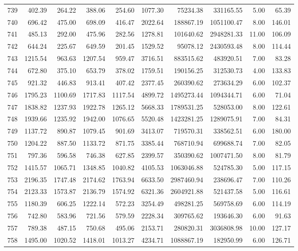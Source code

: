 \begin{tabular}{lrrrrrrrrr}
739 & 402.39 & 264.22 & 388.06 & 254.60 & 1077.30 & 75234.38 & 331165.55 & 5.00 & 65.39 \\
740 & 696.42 & 475.00 & 698.09 & 416.47 & 2022.64 & 188867.19 & 1051100.47 & 8.00 & 146.01 \\
741 & 485.13 & 292.00 & 475.96 & 282.56 & 1278.81 & 101640.62 & 2948281.33 & 11.00 & 106.09 \\
742 & 644.24 & 225.67 & 649.59 & 201.45 & 1529.52 & 95078.12 & 2430593.48 & 8.00 & 114.44 \\
743 & 1215.54 & 963.63 & 1207.54 & 959.47 & 3716.51 & 883515.62 & 483920.51 & 7.00 & 83.28 \\
744 & 672.80 & 375.10 & 653.79 & 378.02 & 1759.51 & 190156.25 & 312530.73 & 4.00 & 133.83 \\
745 & 921.32 & 446.83 & 913.41 & 407.42 & 2377.45 & 260390.62 & 273634.29 & 6.00 & 102.37 \\
746 & 1795.23 & 1100.69 & 1717.83 & 1117.54 & 4899.72 & 1495273.44 & 1094344.71 & 6.00 & 71.04 \\
747 & 1838.82 & 1237.93 & 1922.78 & 1265.12 & 5668.33 & 1789531.25 & 528053.00 & 8.00 & 122.61 \\
748 & 1939.66 & 1235.92 & 1942.00 & 1076.65 & 5520.48 & 1423281.25 & 1289075.91 & 7.00 & 84.31 \\
749 & 1137.72 & 890.87 & 1079.45 & 901.69 & 3413.07 & 719570.31 & 338562.51 & 6.00 & 180.00 \\
750 & 1204.22 & 887.50 & 1133.72 & 871.75 & 3385.44 & 768710.94 & 699688.74 & 7.00 & 82.05 \\
751 & 797.36 & 596.58 & 746.38 & 627.85 & 2399.57 & 350390.62 & 1007471.50 & 8.00 & 81.79 \\
752 & 1415.57 & 1065.71 & 1348.85 & 1040.82 & 4105.53 & 1063046.88 & 524785.30 & 5.00 & 117.15 \\
753 & 2196.35 & 1747.48 & 2174.62 & 1763.94 & 6633.50 & 2987460.94 & 238696.47 & 7.00 & 110.26 \\
754 & 2123.33 & 1573.87 & 2136.79 & 1574.92 & 6321.36 & 2604921.88 & 521437.58 & 5.00 & 116.61 \\
755 & 1180.39 & 606.25 & 1222.14 & 572.23 & 3254.49 & 498281.25 & 569758.69 & 6.00 & 114.19 \\
756 & 742.80 & 583.96 & 721.56 & 579.59 & 2228.34 & 309765.62 & 193646.30 & 6.00 & 91.63 \\
757 & 789.38 & 487.15 & 750.68 & 495.06 & 2153.71 & 280820.31 & 3036808.98 & 10.00 & 127.17 \\
758 & 1495.00 & 1020.52 & 1418.01 & 1013.27 & 4234.71 & 1088867.19 & 182950.99 & 6.00 & 126.71 \\

\end{tabular}
